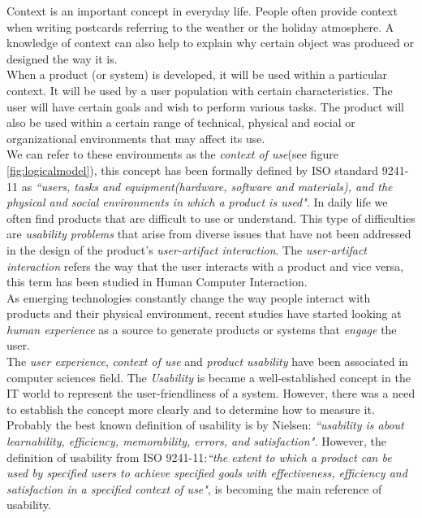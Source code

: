 Context is an important concept in everyday life. People often provide
context when writing postcards referring to the weather or the holiday
atmosphere. A knowledge of context can also help to explain why certain
object was produced or designed the way it is.\\ When a product 
(or system) is developed, it
will be used within a particular context. It will be used by a user
population with certain characteristics. The user will have certain
goals and wish to perform various tasks. The product will also be used
within a certain range of technical, physical and social or
organizational environments\cite{maguire2001context} that may affect
its use.\\   
We can refer to these environments as the \textit{context of use}(see
figure \ref{fig:logicalmodel}), this concept has been formally defined
by ISO standard 9241-11\cite{international1998iso} as \textit{``users,
tasks and equipment(hardware, software and materials), and the
physical and social environments in which a product is used"}. 
In daily life we often find products that are difficult to use or
understand. This type of difficulties are \textit{usability problems}
that arise from  diverse issues that have not been addressed in the
design of the product's \textit{user-artifact interaction}. The
\textit{user-artifact interaction} refers the way that the user
interacts with a product and vice versa, this term has been studied
in Human Computer Interaction. \\As emerging technologies constantly
change the way people interact with products and their physical
environment, recent studies have started looking at \textit{human
experience} as a source to generate products or systems that
\textit{engage} the user.\\
The \textit{user experience}, \textit{context of use} and
\textit{product usability} have been associated in computer sciences
field. The \textit{Usability} is became a well-established concept in
the IT world to represent the user-friendliness of a system. However,
there was a need to establish the concept more clearly and to
determine how to measure it. Probably the best known definition of
usability is by Nielsen\cite{nielsen1994usability}: 
\textit{``usability is about learnability, efficiency, 
memorability, errors, and satisfaction".}
However, the definition of usability from ISO
9241-11\cite{international1998iso}:\textit{``the extent to which a
product can be used by specified users to achieve specified  goals
with effectiveness, efficiency and satisfaction in a  specified
context of use"}, is becoming the main reference of usability. \\
